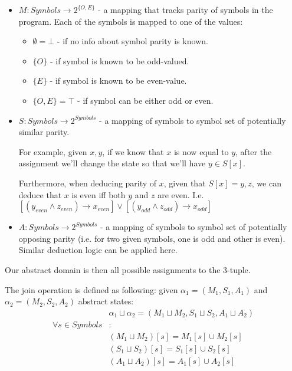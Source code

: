 \begin{itemize}
	\item $M: Symbols \rightarrow 2^{\{O, E\}}$ - a mapping that tracks parity of symbols in the program. Each of the symbols is mapped to one of the values:
	\begin{itemize}
		\item $\emptyset=\bot$ - if no info about symbol parity is known.
		\item $\{O\}$ - if symbol is known to be odd-valued.
		\item $\{E\}$ - if symbol is known to be even-value.
		\item $\{O,E\}=\top$ - if symbol can be either odd or even.
	\end{itemize}
	\item $S: Symbols \rightarrow 2^{Symbols}$ - a mapping of symbols to symbol set of potentially similar parity.
	
	For example, given $x, y$, if we know that $x$ is now equal to $y$, after the assignment we'll change the state so that we'll have $y \in S[x]$.
	
	Furthermore, when  deducing parity of $x$, given that $S[x] = {y,z}$, we can deduce that $x$ is even iff both $y$ and $z$ are even.
	I.e. $[(y_{even} \wedge z_{even})\rightarrow x_{even}]\vee[(y_{odd} \wedge z_{odd})\rightarrow x_{odd}]$
	
	\item $A: Symbols \rightarrow 2^{Symbols}$ - a mapping of symbols to symbol set of potentially opposing parity (i.e. for two given symbols, one is odd and other is even). Similar deduction logic can be applied here.

\end{itemize}
Our abstract domain is then all possible assignments to the 3-tuple.
	
The join operation is defined as following: given $\alpha_1=(M_1,S_1,A_1)$ and $\alpha_2=(M_2,S_2,A_2)$ abstract states:
\begin{align*}
&\alpha_1\sqcup\alpha_2=(M_1\sqcup M_2, S_1 \sqcup S_2, A_1 \sqcup A_2) \\
\forall s \in Symbols&:  \\
&(M_1\sqcup M_2)[s] =M_1[s] \cup M_2[s] \\
&(S_1\sqcup S_2)[s] =S_1[s] \cup S_2[s] \\
&(A_1\sqcup A_2)[s] =A_1[s] \cup A_2[s]
\end{align*}

